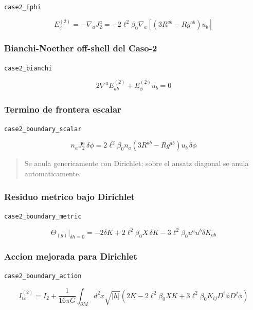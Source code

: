 \documentclass[11pt,a4paper]{article}
\begin{document}
\noindent\texttt{case2\_Ephi}\par\nopagebreak[4]

\[
E^{(2)}_\phi = -\nabla_aJ_2^a=-2\ell^2\beta_0\nabla_a\left[(3R^{ab}-Rg^{ab})u_b\right]
\]

\subsubsection{Bianchi-Noether off-shell del Caso-2}

\noindent\texttt{case2\_bianchi}\par\nopagebreak[4]

\[
2\nabla^aE^{(2)}_{ab}+E^{(2)}_\phi u_b = 0
\]

\subsubsection{Termino de frontera escalar}

\noindent\texttt{case2\_boundary\_scalar}\par\nopagebreak[4]

\[
n_aJ_2^a\,\delta\phi = 2\ell^2\beta_0n_a(3R^{ab}-Rg^{ab})u_b\,\delta\phi
\]

\begin{quote}\small Se anula genericamente con Dirichlet; sobre el ansatz diagonal se anula automaticamente.\end{quote}

\subsubsection{Residuo metrico bajo Dirichlet}

\noindent\texttt{case2\_boundary\_metric}\par\nopagebreak[4]

\[
\Theta_{(g)}\big|_{\delta h=0} = -2\delta K+2\ell^2\beta_0X\,\delta K-3\ell^2\beta_0u^au^b\delta K_{ab}
\]

\subsubsection{Accion mejorada para Dirichlet}

\noindent\texttt{case2\_boundary\_action}\par\nopagebreak[4]

\[
I^{(2)}_{\mathrm{tot}} = I_2+\frac{1}{16\pi G}\int_{\partial M}d^2x\sqrt{|h|}\left(2K-2\ell^2\beta_0XK+3\ell^2\beta_0K_{ij}D^i\phi D^j\phi\right)
\]
\end{document}
